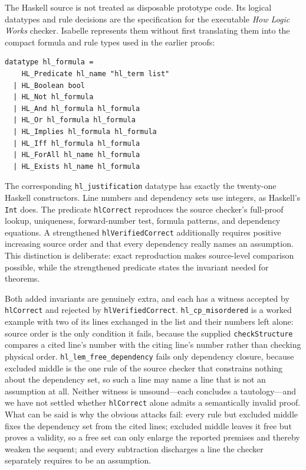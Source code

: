 \documentclass[11pt]{article}
\theoremstyle{plain}
\theoremstyle{definition}
\theoremstyle{remark}
\begin{document}
The Haskell source is not treated as disposable prototype code. Its logical
datatypes and rule decisions are the specification for the executable
\emph{How Logic Works} checker. Isabelle represents them without first
translating them into the compact formula and rule types used in the earlier
proofs:

\begin{lstlisting}[language={}]
datatype hl_formula =
    HL_Predicate hl_name "hl_term list"
  | HL_Boolean bool
  | HL_Not hl_formula
  | HL_And hl_formula hl_formula
  | HL_Or hl_formula hl_formula
  | HL_Implies hl_formula hl_formula
  | HL_Iff hl_formula hl_formula
  | HL_ForAll hl_name hl_formula
  | HL_Exists hl_name hl_formula
\end{lstlisting}

\noindent The corresponding \verb|hl_justification| datatype has exactly the
twenty-one Haskell constructors. Line numbers and dependency sets use
integers, as Haskell's \verb|Int| does. The predicate \verb|hlCorrect|
reproduces the source checker's full-proof lookup, uniqueness, forward-number
test, formula patterns, and dependency equations. A strengthened
\verb|hlVerifiedCorrect| additionally requires positive increasing source
order and that every dependency really names an assumption. This distinction
is deliberate: exact reproduction makes source-level comparison possible,
while the strengthened predicate states the invariant needed for theorems.

Both added invariants are genuinely extra, and each has a witness accepted by
\verb|hlCorrect| and rejected by \verb|hlVerifiedCorrect|.
\verb|hl_cp_misordered| is a worked example with two of its lines exchanged in
the list and their numbers left alone: source order is the only condition it
fails, because the supplied \verb|checkStructure| compares a cited line's
number with the citing line's number rather than checking physical order.
\verb|hl_lem_free_dependency| fails only dependency closure, because excluded
middle is the one rule of the source checker that constrains nothing about the
dependency set, so such a line may name a line that is not an assumption at
all. Neither witness is unsound---each concludes a tautology---and we have not
settled whether \verb|hlCorrect| alone admits a semantically invalid proof.
What can be said is why the obvious attacks fail: every rule but excluded
middle fixes the dependency set from the cited lines; excluded middle leaves
it free but proves a validity, so a free set can only enlarge the reported
premises and thereby weaken the sequent; and every subtraction discharges a
line the checker separately requires to be an assumption.
\end{document}
